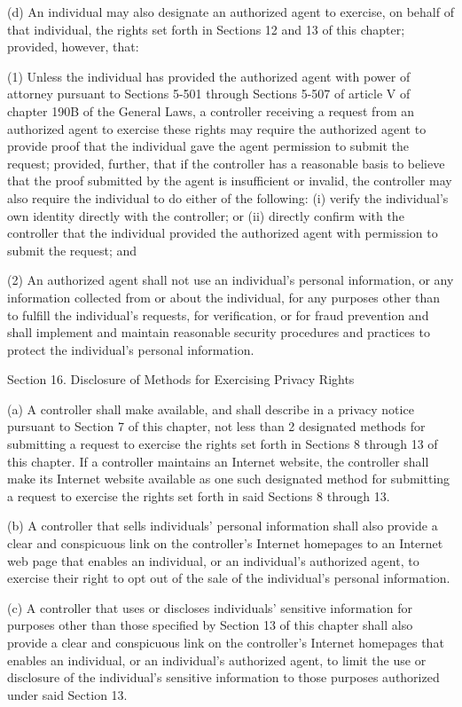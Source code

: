 (d) An individual may also designate an authorized agent to exercise, on behalf of that individual, the rights set forth in Sections 12 and 13 of this chapter; provided, however, that:

(1) Unless the individual has provided the authorized agent with power of attorney pursuant to Sections 5-501 through Sections 5-507 of article V of chapter 190B of the General Laws, a controller receiving a request from an authorized agent to exercise these rights may require the authorized agent to provide proof that the individual gave the agent permission to submit the request; provided, further, that if the controller has a reasonable basis to believe that the proof submitted by the agent is insufficient or invalid, the controller may also require the individual to do either of the following: (i) verify the individual’s own identity directly with the controller; or (ii) directly confirm with the controller that the individual provided the authorized agent with permission to submit the request; and

(2) An authorized agent shall not use an individual’s personal information, or any information collected from or about the individual, for any purposes other than to fulfill the individual’s requests, for verification, or for fraud prevention and shall implement and maintain reasonable security procedures and practices to protect the individual’s personal information.

Section 16. Disclosure of Methods for Exercising Privacy Rights

(a) A controller shall make available, and shall describe in a privacy notice pursuant to Section 7 of this chapter, not less than 2 designated methods for submitting a request to exercise the rights set forth in Sections 8 through 13 of this chapter. If a controller maintains an Internet website, the controller shall make its Internet website available as one such designated method for submitting a request to exercise the rights set forth in said Sections 8 through 13. 

(b) A controller that sells individuals’ personal information shall also provide a clear and conspicuous link on the controller’s Internet homepages to an Internet web page that enables an individual, or an individual’s authorized agent, to exercise their right to opt out of the sale of the individual’s personal information.

(c) A controller that uses or discloses individuals’ sensitive information for purposes other than those specified by Section 13 of this chapter shall also provide a clear and conspicuous link on the controller’s Internet homepages that enables an individual, or an individual’s authorized agent, to limit the use or disclosure of the individual’s sensitive information to those purposes authorized under said Section 13.

